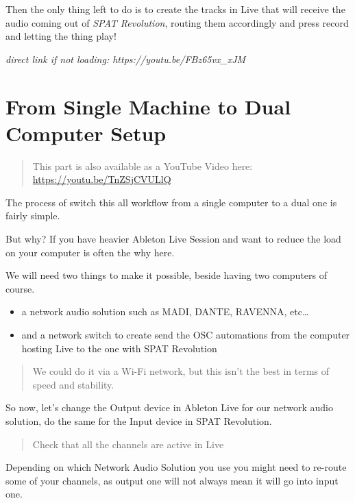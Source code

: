 \documentclass[
  letterpaper,
  DIV=11,
  numbers=noendperiod]{scrreport}
\providecommand{\tightlist}{%
  \setlength{\itemsep}{0pt}\setlength{\parskip}{0pt}}\usepackage{longtable,booktabs,array}
\begin{document}
Then the only thing left to do is to create the tracks in Live that will
receive the audio coming out of \emph{SPAT Revolution}, routing them
accordingly and press record and letting the thing play!

\emph{direct link if not loading: https://youtu.be/FBz65vx\_xJM}

\hypertarget{from-single-machine-to-dual-computer-setup}{%
\section{From Single Machine to Dual Computer
Setup}\label{from-single-machine-to-dual-computer-setup}}

\begin{quote}
This part is also available as a YouTube Video here:
\url{https://youtu.be/TnZSjCVULlQ}
\end{quote}

The process of switch this all workflow from a single computer to a dual
one is fairly simple.

But why? If you have heavier Ableton Live Session and want to reduce the
load on your computer is often the why here.

We will need two things to make it possible, beside having two computers
of course.

\begin{itemize}
\tightlist
\item
  a network audio solution such as MADI, DANTE, RAVENNA, etc\ldots{}
\item
  and a network switch to create send the OSC automations from the
  computer hosting Live to the one with SPAT Revolution
\end{itemize}

\begin{quote}
We could do it via a Wi-Fi network, but this isn't the best in terms of
speed and stability.
\end{quote}

So now, let's change the Output device in Ableton Live for our network
audio solution, do the same for the Input device in SPAT Revolution.

\begin{quote}
Check that all the channels are active in Live
\end{quote}

Depending on which Network Audio Solution you use you might need to
re-route some of your channels, as output one will not always mean it
will go into input one.
\end{document}
